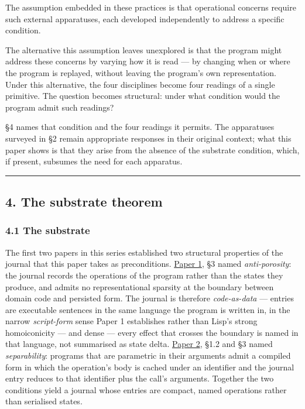 \documentclass[
]{article}
\begin{document}
The assumption embedded in these practices is that operational concerns
require such external apparatuses, each developed independently to
address a specific condition.

The alternative this assumption leaves unexplored is that the program
might address these concerns by varying how it is read --- by changing
when or where the program is replayed, without leaving the program's own
representation. Under this alternative, the four disciplines become four
readings of a single primitive. The question becomes structural: under
what condition would the program admit such readings?

§4 names that condition and the four readings it permits. The
apparatuses surveyed in §2 remain appropriate responses in their
original context; what this paper shows is that they arise from the
absence of the substrate condition, which, if present, subsumes the need
for each apparatus.

\begin{center}\rule{0.5\linewidth}{0.5pt}\end{center}

\subsection{4. The substrate theorem}\label{the-substrate-theorem}

\subsubsection{4.1 The substrate}\label{the-substrate}

The first two papers in this series established two structural
properties of the journal that this paper takes as preconditions.
\href{01-anti-porosity.md}{Paper 1}, §3 named \emph{anti-porosity}: the
journal records the operations of the program rather than the states
they produce, and admits no representational sparsity at the boundary
between domain code and persisted form. The journal is therefore
\emph{code-as-data} --- entries are executable sentences in the same
language the program is written in, in the narrow \emph{script-form}
sense Paper 1 establishes rather than Lisp's strong homoiconicity ---
and dense --- every effect that crosses the boundary is named in that
language, not summarised as state delta.
\href{02-program-value-separability.md}{Paper 2}, §1.2 and §3 named
\emph{separability}: programs that are parametric in their arguments
admit a compiled form in which the operation's body is cached under an
identifier and the journal entry reduces to that identifier plus the
call's arguments. Together the two conditions yield a journal whose
entries are compact, named operations rather than serialised states.
\end{document}

